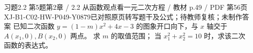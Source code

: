 \par\noindent\begin{minipage}{\linewidth}
\begin{bankitem}{习题2.2 第5题}{第2章 / 2.2 从函数观点看一元二次方程 / 教材 p.49 / PDF 第56页}{XJ-B1-C02-HW-P049-Y0879}{已对照原页转写题干及公式；待教师复核；未制作答案}
已知二次函数 $y=(1-m)x^2+4x-3$ 的图象开口向下，与 $x$ 轴交于 $A(x_1,0),B(x_2,0)$ 两点。
求 $m$ 的取值范围；
当 $x_1^2+x_2^2=10$ 时，求该二次函数的表达式。
\end{bankitem}
\end{minipage}\par\medskip
